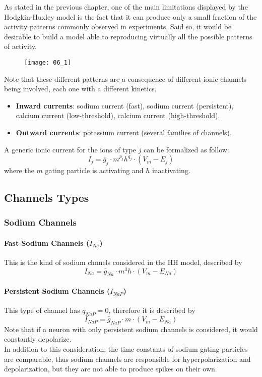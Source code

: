 As stated in the previous chapter, one of the main limitations displayed by the
Hodgkin-Huxley model is the fact that it can produce only a small fraction of the
activity patterns commonly observed in experiments. Said so, it would be desirable to
build a model able to reproducing virtually all the possible patterns of activity.
\begin{figure}[H]
    \texttt{[image: 06\_1]}
    \centering
\end{figure}
Note that these different patterns are a consequence of different ionic channels being
involved, each one with a different kinetics.
\begin{itemize}
    \item \textbf{Inward currents}: sodium current (fast), sodium current (persistent),
          calcium current (low-threshold), calcium current (high-threshold).
    \item \textbf{Outward currents}: potassium current (several families of channels).
\end{itemize}
A generic ionic current for the ions of type \(j\) can be formalized as follow:
\begin{equation*}
    I_{j}=\bar{g}_{j}\cdot{m^{p_{j}}h^{q_{j}}}\cdot{(V_{m}-E_{j})}
\end{equation*}
where the \(m\) gating particle is activating and \(h\) inactivating.

\subsection{Channels Types}
\subsubsection{Sodium Channels}
\paragraph{Fast Sodium Channels (\(I_{Na}\))} This is the kind of sodium chnnels
considered in the HH model, described by
\begin{equation*}
    I_{Na}=\bar{g}_{Na}\cdot{m^{3}h}\cdot{(V_{m}-E_{Na})}
\end{equation*}
\paragraph{Persistent Sodium Channels (\(I_{NaP}\))} This type of channel has \(q_{NaP}=0\),
therefore it is described by
\begin{equation*}
    I_{NaP}=\bar{g}_{NaP}\cdot{m}\cdot{(V_{m}-E_{Na})}
\end{equation*}
Note that if a neuron with only persistent sodium channels is considered, it would
constantly depolarize.\\
In addition to this consideration, the time constants of sodium gating particles are
comparable, thus sodium channels are responsible for hyperpolarization and depolarization,
but they are not able to produce spikes on their own.
